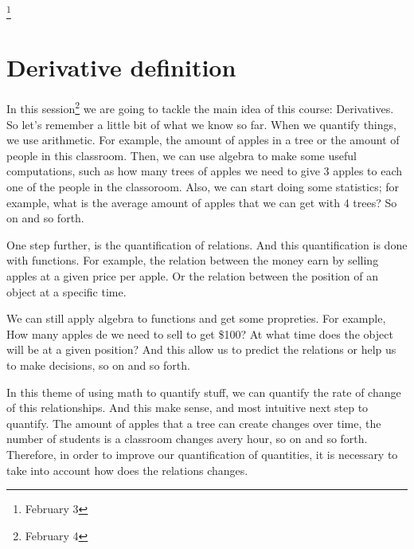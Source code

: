 \documentclass[../main-notes.tex]{subfile}
\begin{document}
\footnote{February 3}


\newpage

\section{Derivative definition}


In this session\footnote{February 4} we are going to tackle the main idea of this course: Derivatives.
So let's remember a little bit of what we know so far.
When we quantify things, we use arithmetic.
For example, the amount of apples in a tree or the amount of people in this classroom.
Then, we can use algebra to make some useful computations, such as how many trees of apples we need to give 3 apples to each one of the people in the classoroom.
Also, we can start doing some statistics; for example, what is the average amount of apples that we can get with 4 trees?
So on and so forth.

One step further, is the quantification of relations.
And this quantification is done with functions.
For example, the relation between the money earn by selling apples at a given price per apple.
Or the relation between the position of an object at a specific time.

We can still apply algebra to functions and get some propreties.
For example, How many apples de we need to sell to get \$100? At what time does the object will be at a given position?
And this allow us to predict the relations or help us to make decisions, so on and so forth.

In this theme of using math to quantify stuff, we can quantify the rate of change of this relationships.
And this make sense, and most intuitive next step to quantify.
The amount of apples that a tree can create changes over time, the number of students is a classroom changes avery hour, so on and so forth.
Therefore, in order to improve our quantification of quantities, it is necessary to take into account how does the relations changes.
\end{document}
